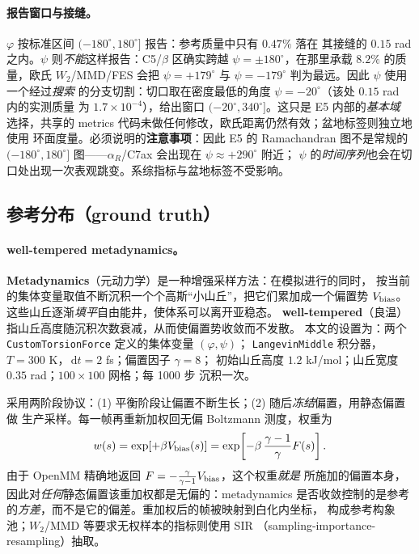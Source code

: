 \documentclass[11pt,a4paper]{article}
\newcommand{\dd}{\,\mathrm{d}}
\begin{document}
\paragraph{报告窗口与接缝。}
$\varphi$ 按标准区间 $(-180^\circ,180^\circ]$ 报告：参考质量中只有 $0.47\%$ 落在
其接缝的 $0.15$ rad 之内。$\psi$ 则\emph{不能}这样报告：C5/$\beta$ 区确实跨越
$\psi=\pm180^\circ$，在那里承载 $8.2\%$ 的质量，欧氏 $W_2$/MMD/FES 会把
$\psi=+179^\circ$ 与 $\psi=-179^\circ$ 判为最远。因此 $\psi$ 使用一个经过\emph{搜索}
的分支切割：切口取在密度最低的角度 $\psi=-20^\circ$（该处 $0.15$ rad 内的实测质量
为 $1.7\times10^{-4}$），给出窗口 $(-20^\circ,340^\circ]$。这只是 E5 内部的\emph{基本域}
选择，共享的 metrics 代码未做任何修改，欧氏距离仍然有效；盆地标签则独立地使用
环面度量。必须说明的\textbf{注意事项}：因此 E5 的 Ramachandran 图不是常规的
$(-180^\circ,180^\circ]$ 图——$\alpha_R$/C7ax 会出现在 $\psi\approx+290^\circ$ 附近；
$\psi$ 的\emph{时间序列}也会在切口处出现一次表观跳变。系综指标与盆地标签不受影响。

\subsection{参考分布（ground truth）}

\paragraph{well-tempered metadynamics。}
\textbf{Metadynamics}（元动力学）是一种增强采样方法：在模拟进行的同时，
按当前的集体变量取值不断沉积一个个高斯“小山丘”，把它们累加成一个偏置势
$V_{\rm bias}$。这些山丘逐渐\emph{填平}自由能井，使体系可以离开亚稳态。
\textbf{well-tempered}（良温）指山丘高度随沉积次数衰减，从而使偏置势收敛而不发散。
本文的设置为：两个 \texttt{CustomTorsionForce} 定义的集体变量 $(\varphi,\psi)$；
\texttt{LangevinMiddle} 积分器，$T=300$ K，$\dd t=2$ fs；偏置因子 $\gamma=8$；
初始山丘高度 $1.2$ kJ/mol；山丘宽度 $0.35$ rad；$100\times100$ 网格；每 1000 步
沉积一次。

采用两阶段协议：(1) 平衡阶段让偏置不断生长；(2) 随后\emph{冻结}偏置，用静态偏置做
生产采样。每一帧再重新加权回无偏 Boltzmann 测度，权重为
\begin{equation}
 w(s)=\exp\!\left[+\beta V_{\rm bias}(s)\right]
 =\exp\!\left[-\beta\,\frac{\gamma-1}{\gamma}F(s)\right].
\end{equation}
由于 OpenMM 精确地返回 $F=-\frac{\gamma}{\gamma-1}V_{\rm bias}$，这个权重\emph{就是}
所施加的偏置本身，因此对\emph{任何}静态偏置该重加权都是无偏的：metadynamics
是否收敛控制的是参考的\emph{方差}，而不是它的偏差。重加权后的帧被映射到白化内坐标，
构成参考构象池；$W_2$/MMD 等要求无权样本的指标则使用 SIR
（sampling-importance-resampling）抽取。
\end{document}
